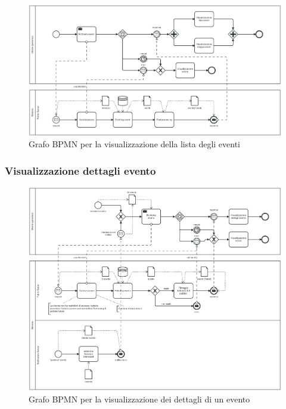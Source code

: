\documentclass{article}
\begin{document}
\begin{figure}[htbp]
    \label{7.1.3}
    \centering
    \includegraphics[width=1\textwidth]{Images/BPMN - list.png}
    \caption{Grafo BPMN per la visualizzazione della lista degli eventi}
\end{figure}

\clearpage

\subsubsection{Visualizzazione dettagli evento}

\begin{figure}[htbp]
    \label{7.1.4}
    \centering
    \includegraphics[width=1\textwidth]{Images/BPMN - details.png}
    \caption{Grafo BPMN per la visualizzazione dei dettagli di un evento}
\end{figure}
\end{document}
